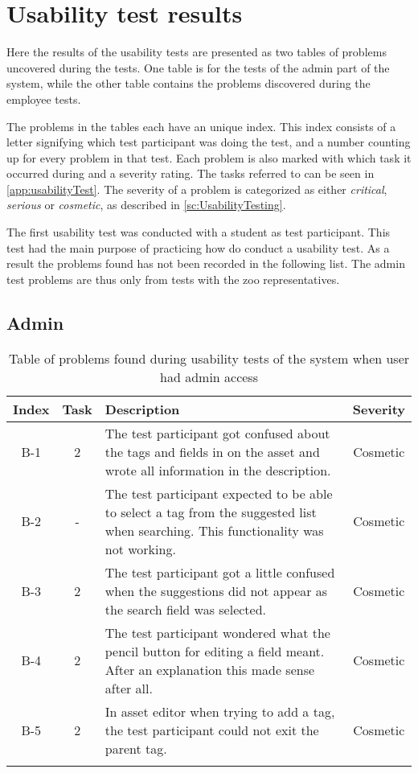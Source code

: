 \chapter{Usability test results}\label{app:UsabilityProblems}
Here the results of the usability tests are presented as two tables of problems uncovered during the tests. One table is for the tests of the admin part of the system, while the other table contains the problems discovered during the employee tests.
\par
The problems in the tables each have an unique index. This index consists of a letter signifying which test participant was doing the test, and a number counting up for every problem in that test. Each problem is also marked with which task it occurred during and a severity rating. The tasks referred to can be seen in \autoref{app:usabilityTest}. The severity of a problem is categorized as either \textit{critical}, \textit{serious} or \textit{cosmetic}, as described in \autoref{sc:UsabilityTesting}. 
\par
The first usability test was conducted with a student as test participant. This test had the main purpose of practicing how do conduct a usability test. As a result the problems found has not been recorded in the following list. The admin test problems are thus only from tests with the zoo representatives. 

\section*{Admin}

\begin{longtable}{| c | c | p{8cm} | c |}
        \hline
        \textbf{Index} & \textbf{Task} & \textbf{Description} & \textbf{Severity}
        \\
        \hline
        B-1 & 2 & The test participant got confused about the tags and fields in on the asset and wrote all information in the description. &  Cosmetic
        \\
        \hline
        B-2 & - & The test participant expected to be able to select a tag from the suggested list when searching. This functionality was not working. & Cosmetic
        \\
        \hline
        B-3 & 2 & The test participant got a little confused when the suggestions did not appear as the search field was selected. & Cosmetic
        \\
        \hline
        B-4 & 2 & The test participant wondered what the pencil button for editing a field meant. After an explanation this made sense after all. & Cosmetic
        \\
        \hline
        B-5 & 2 & In asset editor when trying to add a tag, the test participant could not exit the parent tag. & Cosmetic
        \\
        \hline
    \caption{Table of problems found during usability tests of the system when user had admin access}
    \label{tab:AdminProblems}
   
\end{longtable}

